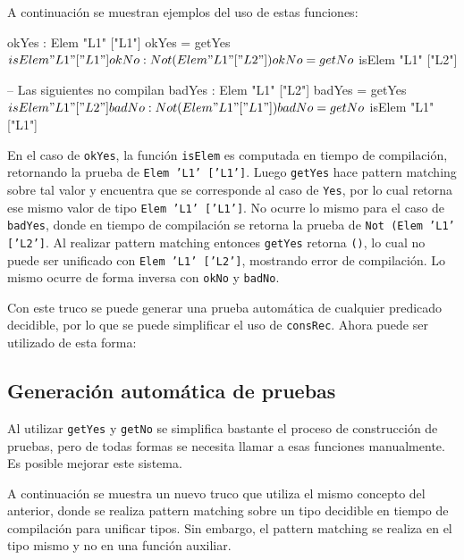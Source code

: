 A continuación se muestran ejemplos del uso de estas funciones:

\begin{code}
okYes : Elem "L1" ["L1"]
okYes = getYes $ isElem "L1" ["L1"]

okNo : Not (Elem "L1" ["L2"])
okNo = getNo $ isElem "L1" ["L2"]

-- Las siguientes no compilan
badYes : Elem "L1" ["L2"]
badYes = getYes $ isElem "L1" ["L2"]

badNo : Not (Elem "L1" ["L1"])
badNo = getNo $ isElem "L1" ["L1"]
\end{code}

En el caso de \texttt{okYes}, la función \texttt{isElem} es computada en tiempo de compilación, retornando la prueba de \texttt{Elem 'L1' ['L1']}. Luego \texttt{getYes} hace pattern matching sobre tal valor y encuentra que se corresponde al caso de \texttt{Yes}, por lo cual retorna ese mismo valor de tipo \texttt{Elem 'L1' ['L1']}. No ocurre lo mismo para el caso de \texttt{badYes}, donde en tiempo de compilación se retorna la prueba de \texttt{Not (Elem 'L1' ['L2']}. Al realizar pattern matching entonces \texttt{getYes} retorna \texttt{()}, lo cual no puede ser unificado con \texttt{Elem 'L1' ['L2']}, mostrando error de compilación. Lo mismo ocurre de forma inversa con \texttt{okNo} y \texttt{badNo}.

Con este truco se puede generar una prueba automática de cualquier predicado decidible, por lo que se puede simplificar el uso de \texttt{consRec}. Ahora puede ser utilizado de esta forma:


\subsection{Generación automática de pruebas}

Al utilizar \texttt{getYes} y \texttt{getNo} se simplifica bastante el proceso de construcción de pruebas, pero de todas formas se necesita llamar a esas funciones manualmente. Es posible mejorar este sistema.

A continuación se muestra un nuevo truco que utiliza el mismo concepto del anterior, donde se realiza pattern matching sobre un tipo decidible en tiempo de compilación para unificar tipos. Sin embargo, el pattern matching se realiza en el tipo mismo y no en una función auxiliar.

